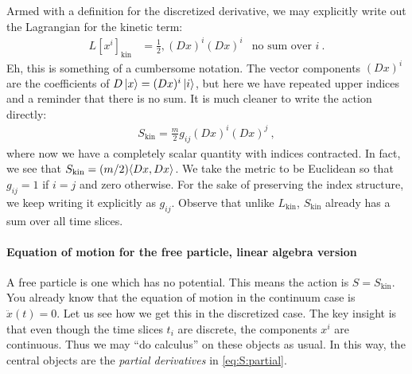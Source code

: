 Armed with a definition for the discretized derivative, we may explicitly write out the Lagrangian for the kinetic term:
\begin{align}
    L[x^i]_\text{kin} &= \frac{1}{2} , (Dx)^i (Dx)^i 
    &
    \text{no sum over }i \ .
\end{align}
Eh, this is something of a cumbersome notation. The vector components $(Dx)^i$ are the coefficients of $D\left|x\right\rangle = (Dx)^i\left|i\right\rangle$, but here we have repeated upper indices and a reminder that there is no sum. It is much cleaner to write the action directly:
\begin{align}
    S_\text{kin} = \frac{m}{2} g_{ij} (Dx)^i (Dx)^j \ ,
    \label{eq:S:kin:discrete}
\end{align}
where now we have a completely scalar quantity with indices contracted. In fact, we see that $S_\textnormal{kin} = (m/2)\langle Dx, Dx \rangle$. We take the metric to be Euclidean so that $g_{ij} = 1$ if $i=j$ and zero otherwise. For the sake of preserving the index structure, we keep writing it explicitly as $g_{ij}$. 
% 
Observe that unlike $L_\text{kin}$, $S_\text{kin}$ already has a sum over all time slices. 


\paragraph{Equation of motion for the free particle, linear algebra version} A free particle is one which has no potential. This means the action is $S=S_\text{kin}$. You already know that the equation of motion in the continuum case is $\ddot{x}(t)=0$. Let us see how we get this in the discretized case.  The key insight is that even though the time slices $t_i$ are discrete, the components $x^i$ are continuous. Thus we may ``do calculus'' on these objects as usual. In this way, the central objects are the \emph{partial derivatives} in \eqref{eq:S:partial}.


